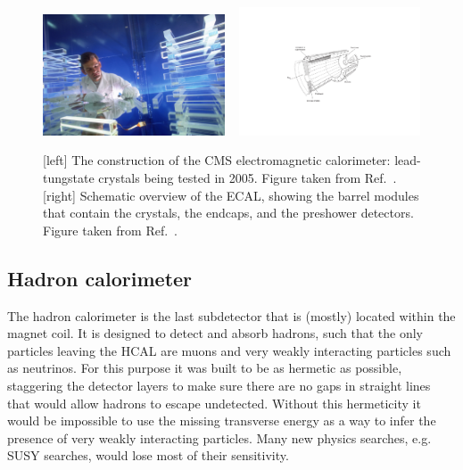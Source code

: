 \begin{figure}[htpb]
  \centering
  \includegraphics[width=0.48\textwidth]{figures/cms/cms_ecal_crystal}
~
  \includegraphics[width=0.48\textwidth]{figures/cms/CMS_ECAL}
  \caption{[left] The construction of the CMS electromagnetic calorimeter: lead-tungstate crystals
being tested in 2005. Figure taken from Ref.~\cite{CMS_ecal_crystal}.
[right] Schematic overview of the ECAL, showing the barrel modules that contain the crystals, the
endcaps, and the preshower detectors. Figure taken from Ref.~\cite{Chatrchyan:2008aa}.
  \label{fig:cms_ecal_crystal}}
\end{figure}

\subsection{Hadron calorimeter \label{sec:cms_hcal}}

The hadron calorimeter is the last subdetector that is (mostly) located within the magnet coil. It
is designed to detect and absorb hadrons, such that the only particles leaving the HCAL are muons
and very weakly interacting particles such as neutrinos.
For this purpose it was built to be as hermetic as possible, staggering the detector layers to
make sure there are no gaps in straight lines that would allow hadrons to escape undetected.
Without this hermeticity it would be impossible to use the missing transverse energy as a way to
infer the presence of very weakly interacting particles. Many new physics searches, e.g. SUSY
searches, would lose most of their sensitivity. 

